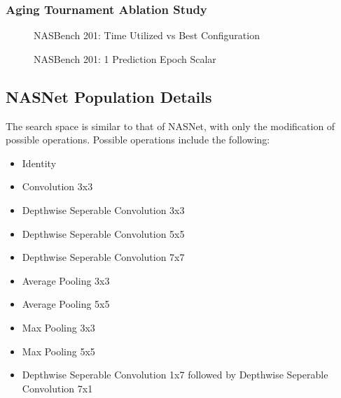 \documentclass[twocolumn]{article}
\begin{document}
\FloatBarrier
\subsubsection{Aging Tournament Ablation Study}

\begin{figure}[!h]
    \begin{center}
        \resizebox{0.9\columnwidth}{!}{
            
        }
        \caption{NASBench 201: Time Utilized vs Best Configuration}
        \label{fig:evo_ext_nasbench_best_at_slice}
    \end{center}
\end{figure}

\begin{figure}[!h]
    \begin{center}
        \resizebox{0.9\columnwidth}{!}{
            
        }
        \caption{NASBench 201: 1 Prediction Epoch Scalar}
        \label{fig:evo_ext_nasbench_1x_acceleration}
    \end{center}
\end{figure}
\onecolumn

\subsection{NASNet Population Details}

The search space is similar to that of NASNet, with only the modification of possible operations. 
Possible operations include the following:
\begin{multicols}{2}
\begin{itemize}
    \item Identity
    \item Convolution 3x3
    \item Depthwise Seperable Convolution 3x3
    \item Depthwise Seperable Convolution 5x5
    \item Depthwise Seperable Convolution 7x7
    \item Average Pooling 3x3
    \item Average Pooling 5x5
    \item Max Pooling 3x3
    \item Max Pooling 5x5
    \item Depthwise Seperable Convolution 1x7 followed by Depthwise Seperable Convolution 7x1
\end{itemize}
\end{multicols}
\end{document}
